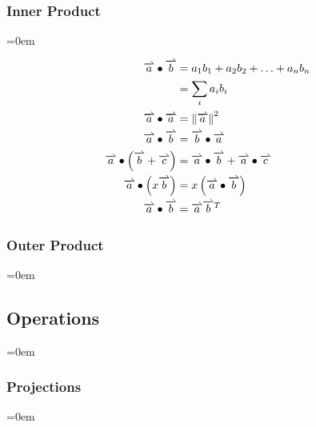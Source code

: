 \subsubsection{Inner Product}
\label{sssec:inner_product}
\parindent=0em

\[
	\begin{aligned}
		\harpoon{a} \bullet \harpoon{b}                         & = a_{1}b_{1}+a_{2}b_{2} + \ldots + a_{n}b_{n} \\
		                                                        & = \sum_{i}{a_{i}b_{i}} \\
	\harpoon{a} \bullet \harpoon{a}                             & = \left\| \harpoon{a} \right\|^{2} \\
	\harpoon{a} \bullet \harpoon{b}                             & = \harpoon{b} \bullet \harpoon{a} \\
	\harpoon{a} \bullet \left(\harpoon{b} + \harpoon{c} \right) & = \harpoon{a} \bullet \harpoon{b} + \harpoon{a} \bullet \harpoon{c} \\
	\harpoon{a} \bullet \left( x \harpoon{b} \right)            & = x \left(\harpoon{a} \bullet \harpoon{b}\right) \\
	\harpoon{a} \bullet \harpoon{b}                       & = \harpoon{a}\harpoon{b}^{T}
	\end{aligned}
\]



\subsubsectionend
\subsubsection{Outer Product}
\label{sssec:outer_product}
\parindent=0em



\subsubsectionend

\subsectionend

\subsection{Operations}
\label{ssec:operations}
\parindent=0em

\subsubsection{Projections}
\label{sssec:projections}
\parindent=0em

